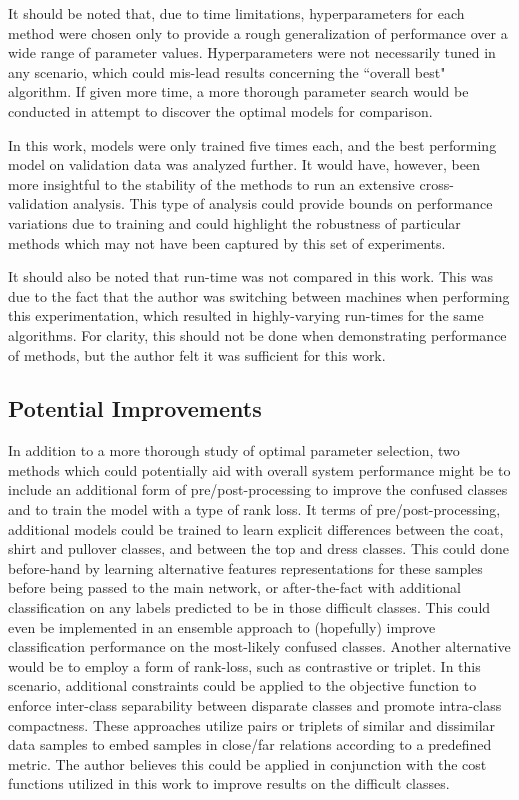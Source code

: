 \documentclass[conference]{IEEEtran}
\begin{document}
It should be noted that, due to time limitations, hyperparameters for each method were chosen only to provide a rough generalization of performance over a wide range of parameter values.  Hyperparameters were not necessarily tuned in any scenario, which could mis-lead results concerning the ``overall best" algorithm.  If given more time, a more thorough parameter search would be conducted in attempt to discover the optimal models for comparison.

In this work, models were only trained five times each, and the best performing model on validation data was analyzed further.  It would have, however, been more insightful to the stability of the methods to run an extensive cross-validation analysis.  This type of analysis could provide bounds on performance variations due to training and could highlight the robustness of particular methods which may not have been captured by this set of experiments.

It should also be noted that run-time was not compared in this work.  This was due to the fact that the author was switching between machines when performing this experimentation, which resulted in highly-varying run-times for the same algorithms.  For clarity, this should not be done when demonstrating performance of methods, but the author felt it was sufficient for this work. 





\subsection{Potential Improvements}
In addition to a more thorough study of optimal parameter selection, two methods which could potentially aid with overall system performance might be to include an additional form of pre/post-processing to improve the confused classes and to train the model with a type of rank loss.  It terms of pre/post-processing, additional models could be trained to learn explicit differences between the coat, shirt and  pullover classes, and between the top and dress classes.  This could done before-hand by learning alternative  features representations for these samples before being passed to the main network, or after-the-fact with additional classification on any labels predicted to be in those difficult classes.  This could even be implemented in an ensemble approach to (hopefully) improve classification performance on the most-likely confused classes.  Another alternative  would be to employ a form of rank-loss, such as contrastive or triplet.  In this scenario, additional constraints could be applied to the objective function to enforce inter-class separability between disparate classes and promote intra-class compactness.  These approaches utilize pairs or triplets of similar and  dissimilar data samples to embed samples  in close/far relations according to a predefined metric.  The author believes this could be applied  in conjunction with the cost functions utilized in this work to improve results on the difficult classes.
\end{document}
